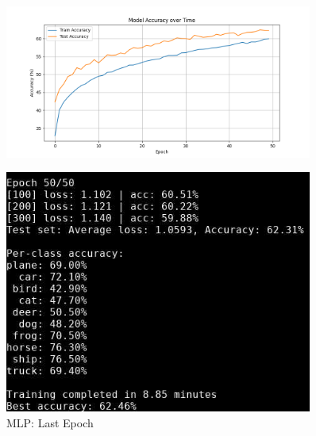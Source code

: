\begin{frame}
\begin{columns}
        \begin{column}{0.5\textwidth}
            \begin{figure}[t]
                \centering
                \vspace{-0.4cm}
                \includegraphics[width=0.9\textwidth]{media/1stAssignment/cifar10_mlp_accuracy.png}
            \end{figure}
            \vspace{-0.8cm}
            \begin{figure}[t]
                \centering
                \includegraphics[width=0.9\textwidth]{media/1stAssignment/mlp_epoch_50.png}
                \vspace{-0.3cm}
                \caption{MLP: Last Epoch}
            \end{figure}
        \end{column}
    \end{columns}
\end{frame}


